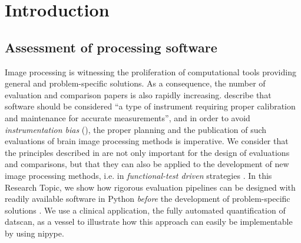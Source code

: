 \documentclass{frontiers}
\begin{document}

\glsresetall[\acronymtype]

\section{Introduction}\label{sec:intro}

\subsection{Assessment of processing software}
\label{sec:intro_software}
Image processing is witnessing the proliferation of computational tools
  providing general and problem-specific solutions.
As a consequence, the number of evaluation and comparison papers is
  also rapidly increasing.
\cite{tustison_instrumentation_2013} describe that software should be considered 
 ``a type of instrument requiring proper calibration and maintenance for accurate measurements'', 
  and in order to avoid \emph{instrumentation bias} (\cite{Shattuck_validation_2009}), the proper planning 
  and the publication of such evaluations of brain image processing methods is imperative. 
We consider that the principles described in \cite{tustison_instrumentation_2013} are not only
  important for the design of evaluations and comparisons, 
  but that they can also be applied to the development of new image processing
  methods, i.e. in \emph{functional-test driven} strategies \citep{andrea_envisioning_2007}.
In this Research Topic, we show how rigorous evaluation pipelines can be designed
  with readily available software in Python \emph{before} the development of 
  problem-specific solutions .
We use a clinical application, the fully automated quantification of \gls*{datscan},
  as a vessel to illustrate how this approach can easily be implementable by using \gls*{nipype}.
\end{document}
